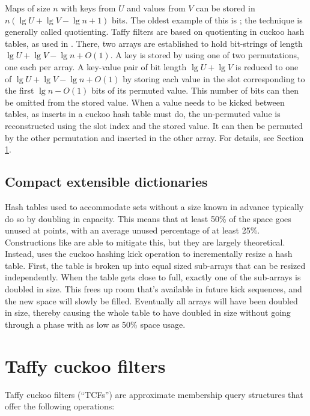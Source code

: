 \documentclass[manuscript,screen,review]{acmart}
\begin{document}
Maps of size $n$ with keys from $U$ and values from $V$ can be stored in $n (\lg U + \lg V - \lg n + 1)$ bits.
The oldest example of this is \cite{knuth}; the technique is generally called quotienting. \cite{quotient-filter}
Taffy filters are based on quotienting in cuckoo hash tables, as used in \cite{backyard}.
There, two arrays are established to hold bit-strings of length $\lg U + \lg V - \lg n + O(1)$.
A key is stored by using one of two permutations, one each per array.
A key-value pair of bit length $\lg U + \lg V$ is reduced to one of $\lg U + \lg V - \lg n + O(1)$ by storing each value in the slot corresponding to the first $\lg n - O(1)$ bits of its permuted value.
This number of bits can then be omitted from the stored value.
When a value needs to be kicked between tables, as inserts in a cuckoo hash table must do, the un-permuted value is reconstructed using the slot index and the stored value.
It can then be permuted by the other permutation and inserted in the other array.
For details, see Section \ref{tcf}. %

\subsection{Compact extensible dictionaries}

Hash tables used to accommodate sets without a size known in advance typically do so by doubling in capacity.
This means that at least 50\% of the space goes unused at points, with an average unused percentage of at least 25\%.
Constructions like \cite{succinct} are able to mitigate this, but they are largely theoretical.
Instead, \cite{dysect} uses the cuckoo hashing kick operation to incrementally resize a hash table.
First, the table is broken up into equal sized sub-arrays that can be resized independently.
When the table gets close to full, exactly one of the sub-arrays is doubled in size.
This frees up room that's available in future kick sequences, and the new space will slowly be filled.
Eventually all arrays will have been doubled in size, thereby causing the whole table to have doubled in size without going through a phase with as low as 50\% space usage.

\section{Taffy cuckoo filters}
\label{tcf}
Taffy cuckoo filters (``TCFs'') are approximate membership query structures that offer the following operations:
\end{document}
